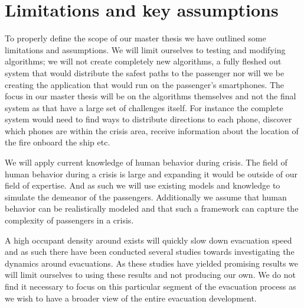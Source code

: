 \chapter{Limitations and key assumptions}
\label{ch:limitations}





To properly define the scope of our master thesis we have outlined
some limitations and assumptions. We will limit ourselves to testing and modifying algorithms;
we will not create completely new algorithms, a fully fleshed out system that would distribute the
safest paths to the passenger nor will we be creating the application that would run on the passenger's smartphones.
The focus in our master thesis will be on the algorithms themselves and not the final system as that have a large set
of challenges itself. For instance the complete system would need to find ways to distribute directions to each phone,
discover which phones are within the crisis area, receive information about the location of the fire onboard the ship etc.

We will apply current knowledge of human behavior during crisis. The field of human behavior during a crisis is large
and expanding it would be outside of our field of expertise. And as such we will use existing models and knowledge
to simulate the demeanor of the passengers. Additionally we assume that human behavior can be realistically modeled
and that such a framework can capture the complexity of passengers in a crisis.

A high occupant density around exists will quickly slow down evacuation speed and as such there have been conducted several studies
towards investigating the dynamics around evacuations. As these studies have yielded promising results we will
limit ourselves to using these results and not producing our own. We do not find it necessary to focus on this particular segment 
of the evacuation process as we wish to have a broader view of the entire evacuation development.

